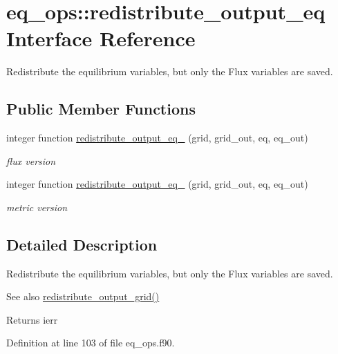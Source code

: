 \hypertarget{interfaceeq__ops_1_1redistribute__output__eq}{}\section{eq\+\_\+ops\+:\+:redistribute\+\_\+output\+\_\+eq Interface Reference}
\label{interfaceeq__ops_1_1redistribute__output__eq}


Redistribute the equilibrium variables, but only the Flux variables are saved.  


\subsection*{Public Member Functions}
\begin{DoxyCompactItemize}
\item 
integer function \hyperlink{interfaceeq__ops_1_1redistribute__output__eq_ac77911cf8c4631896ad2d0fff66e6893}{redistribute\+\_\+output\+\_\+eq\+\_} (grid, grid\+\_\+out, eq, eq\+\_\+out)
\begin{DoxyCompactList}\small\item\em flux version \end{DoxyCompactList}\item 
integer function \hyperlink{interfaceeq__ops_1_1redistribute__output__eq_afdbe3be15436f6abd965bd301ffd819d}{redistribute\+\_\+output\+\_\+eq\+\_} (grid, grid\+\_\+out, eq, eq\+\_\+out)
\begin{DoxyCompactList}\small\item\em metric version \end{DoxyCompactList}\end{DoxyCompactItemize}


\subsection{Detailed Description}
Redistribute the equilibrium variables, but only the Flux variables are saved. 

\begin{DoxySeeAlso}{See also}
\hyperlink{namespacegrid__ops_ab10ef5b486ee3861df2da4e53bc22630}{redistribute\+\_\+output\+\_\+grid()}
\end{DoxySeeAlso}
\begin{DoxyReturn}{Returns}
ierr 
\end{DoxyReturn}


Definition at line 103 of file eq\+\_\+ops.\+f90.




